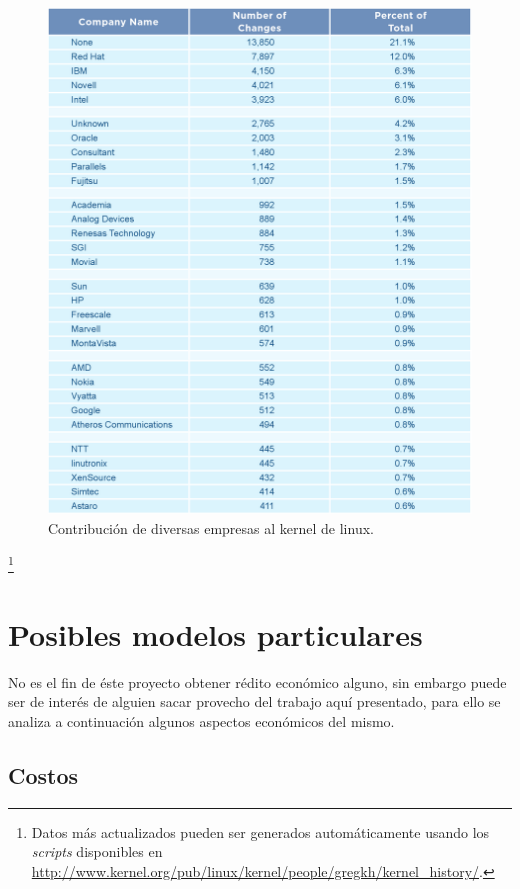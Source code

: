 \begin{figure}[htp]
\centering
\includegraphics[width=13cm]{./img/table4-companies.png}
\caption{Contribuci\'on de diversas empresas al kernel de linux.}
\label{fig:companies_contributions_to_linux}
\end{figure}\footnote{Datos m\'as actualizados pueden ser generados
autom\'aticamente usando los \emph{scripts} disponibles en
\url{http://www.kernel.org/pub/linux/kernel/people/gregkh/kernel_history/}.}


\section{Posibles modelos particulares}
%
No es el fin de \'este proyecto obtener r\'edito econ\'omico alguno, sin
embargo puede ser de inter\'es de alguien sacar provecho del trabajo aqu\'i
presentado, para ello se analiza a continuaci\'on algunos aspectos
econ\'omicos del mismo.

\subsection{Costos}

